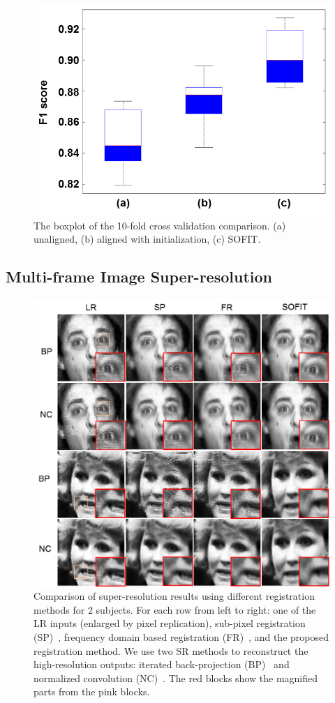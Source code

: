 \documentclass[10pt,journal]{IEEEtran}
\begin{document}
\begin{figure}[htbp]
	\centering
		\includegraphics[width=.6\columnwidth]{fig/vehicle_cls_f1.png}
	\caption{The boxplot of the 10-fold cross validation comparison. (a) unaligned, (b) aligned with initialization, (c) SOFIT.}
	\label{fig:fig_vehicle_cls_f1}
\end{figure}

\subsection{Multi-frame Image Super-resolution}

\begin{figure}[t]
	\centering
		\includegraphics[width=\columnwidth]{fig/superResolution.png}
	\caption{Comparison of super-resolution results using different registration methods for 2 subjects. For each row from left to right: one of the LR inputs (enlarged by pixel replication), sub-pixel registration (SP)~\cite{Keren_CVPR88}, frequency domain based registration (FR)~\cite{Vandewalle06}, and the proposed registration method. We use two SR methods to reconstruct the high-resolution outputs: iterated back-projection (BP)~\cite{Irani91} and normalized convolution (NC)~\cite{Pham_06}. The red blocks show the magnified parts from the pink blocks.}
	\label{fig:superResolution}
\end{figure}
\end{document}

